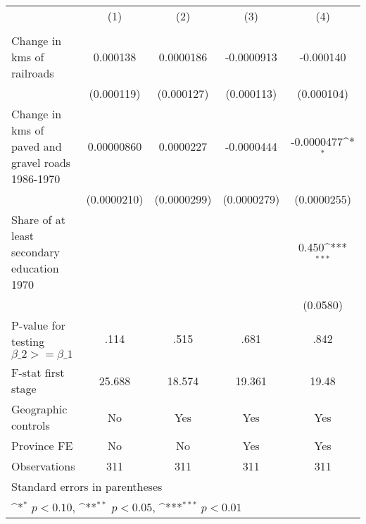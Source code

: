 {
\def\sym#1{\ifmmode^{#1}\else\(^{#1}\)\fi}
\begin{tabular}{l*{4}{c}}
\hline\hline
                &\multicolumn{1}{c}{(1)}&\multicolumn{1}{c}{(2)}&\multicolumn{1}{c}{(3)}&\multicolumn{1}{c}{(4)}\\
                &\multicolumn{1}{c}{}&\multicolumn{1}{c}{}&\multicolumn{1}{c}{}&\multicolumn{1}{c}{}\\
\hline
Change in kms of railroads& 0.000138         &0.0000186         &-0.0000913         &-0.000140         \\
                &(0.000119)         &(0.000127)         &(0.000113)         &(0.000104)         \\
[1em]
Change in kms of paved and gravel roads 1986-1970&0.00000860         &0.0000227         &-0.0000444         &-0.0000477\sym{*}  \\
                &(0.0000210)         &(0.0000299)         &(0.0000279)         &(0.0000255)         \\
[1em]
Share of at least secondary education 1970&                  &                  &                  &    0.450\sym{***}\\
                &                  &                  &                  & (0.0580)         \\
\hline
P-value for testing $\beta\_{2} >= \beta\_{1}$&     .114         &     .515         &     .681         &     .842         \\
F-stat first stage&   25.688         &   18.574         &   19.361         &    19.48         \\
Geographic controls&       No         &      Yes         &      Yes         &      Yes         \\
Province FE     &       No         &       No         &      Yes         &      Yes         \\
Observations    &      311         &      311         &      311         &      311         \\
\hline\hline
\multicolumn{5}{l}{\footnotesize Standard errors in parentheses}\\
\multicolumn{5}{l}{\footnotesize \sym{*} \(p<0.10\), \sym{**} \(p<0.05\), \sym{***} \(p<0.01\)}\\
\end{tabular}
}
